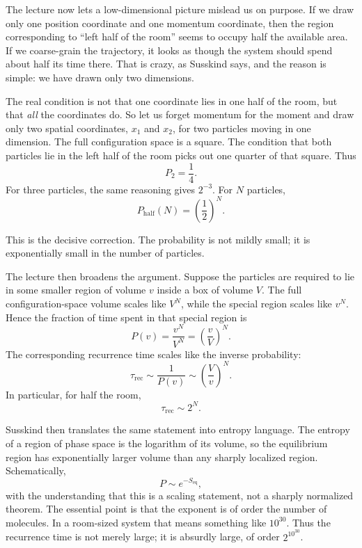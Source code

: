 The lecture now lets a low-dimensional picture mislead us on purpose. If we draw only one position coordinate and one momentum coordinate, then the region corresponding to ``left half of the room'' seems to occupy half the available area. If we coarse-grain the trajectory, it looks as though the system should spend about half its time there. That is crazy, as Susskind says, and the reason is simple: we have drawn only two dimensions.

The real condition is not that one coordinate lies in one half of the room, but that \emph{all} the coordinates do. So let us forget momentum for the moment and draw only two spatial coordinates, \(x_1\) and \(x_2\), for two particles moving in one dimension. The full configuration space is a square. The condition that both particles lie in the left half of the room picks out one quarter of that square. Thus
\begin{equation}
P_2=\frac{1}{4}.
\end{equation}
For three particles, the same reasoning gives \(2^{-3}\). For \(N\) particles,
\begin{equation}
P_{\mathrm{half}}(N)=\left(\frac{1}{2}\right)^N.
\end{equation}

This is the decisive correction. The probability is not mildly small; it is exponentially small in the number of particles.

The lecture then broadens the argument. Suppose the particles are required to lie in some smaller region of volume \(v\) inside a box of volume \(V\). The full configuration-space volume scales like \(V^N\), while the special region scales like \(v^N\). Hence the fraction of time spent in that special region is
\begin{equation}
P(v)=\frac{v^N}{V^N}=\left(\frac{v}{V}\right)^N.
\end{equation}
The corresponding recurrence time scales like the inverse probability:
\begin{equation}
\tau_{\mathrm{rec}} \sim \frac{1}{P(v)} \sim \left(\frac{V}{v}\right)^N.
\end{equation}
In particular, for half the room,
\begin{equation}
\tau_{\mathrm{rec}} \sim 2^N.
\end{equation}

Susskind then translates the same statement into entropy language. The entropy of a region of phase space is the logarithm of its volume, so the equilibrium region has exponentially larger volume than any sharply localized region. Schematically,
\begin{equation}
P \sim e^{-S_{\mathrm{eq}}},
\end{equation}
with the understanding that this is a scaling statement, not a sharply normalized theorem. The essential point is that the exponent is of order the number of molecules. In a room-sized system that means something like \(10^{30}\). Thus the recurrence time is not merely large; it is absurdly large, of order \(2^{10^{30}}\).

